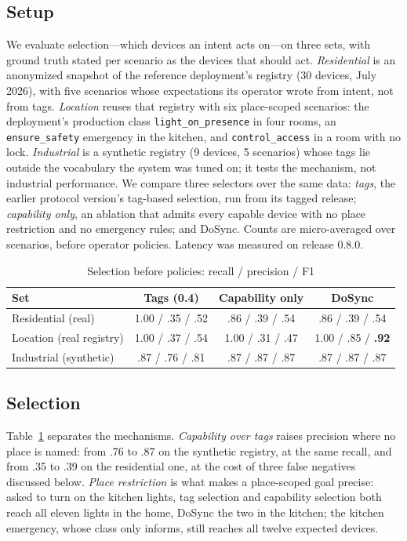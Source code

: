 \documentclass[conference]{IEEEtran}
\newcommand{\code}[1]{\texttt{#1}}
\begin{document}
\subsection{Setup}
We evaluate selection---which devices an intent acts on---on three sets, with ground truth stated per scenario as the devices that should act. \emph{Residential} is an anonymized snapshot of the reference deployment's registry (30 devices, July 2026), with five scenarios whose expectations its operator wrote from intent, not from tags. \emph{Location} reuses that registry with six place-scoped scenarios: the deployment's production class \code{light\_on\_presence} in four rooms, an \code{ensure\_safety} emergency in the kitchen, and \code{control\_access} in a room with no lock. \emph{Industrial} is a synthetic registry (9 devices, 5 scenarios) whose tags lie outside the vocabulary the system was tuned on; it tests the mechanism, not industrial performance. We compare three selectors over the same data: \emph{tags}, the earlier protocol version's tag-based selection, run from its tagged release; \emph{capability only}, an ablation that admits every capable device with no place restriction and no emergency rules; and DoSync. Counts are micro-averaged over scenarios, before operator policies. Latency was measured on release 0.8.0.

\begin{table}[t]
\caption{Selection before policies: recall / precision / F1}
\label{tab:selection}
\centering
\footnotesize
\setlength{\tabcolsep}{3pt}
\begin{tabular}{@{}lccc@{}}
\toprule
\textbf{Set} & \textbf{Tags (0.4)} & \textbf{Capability only} & \textbf{DoSync} \\
\midrule
Residential (real) & 1.00 / .35 / .52 & .86 / .39 / .54 & .86 / .39 / .54 \\
Location (real registry) & 1.00 / .37 / .54 & 1.00 / .31 / .47 & 1.00 / .85 / \textbf{.92} \\
Industrial (synthetic) & .87 / .76 / .81 & .87 / .87 / .87 & .87 / .87 / .87 \\
\bottomrule
\end{tabular}
\end{table}

\subsection{Selection}
Table~\ref{tab:selection} separates the mechanisms. \emph{Capability over tags} raises precision where no place is named: from .76 to .87 on the synthetic registry, at the same recall, and from .35 to .39 on the residential one, at the cost of three false negatives discussed below. \emph{Place restriction} is what makes a place-scoped goal precise: asked to turn on the kitchen lights, tag selection and capability selection both reach all eleven lights in the home, DoSync the two in the kitchen; the kitchen emergency, whose class only informs, still reaches all twelve expected devices.
\end{document}
